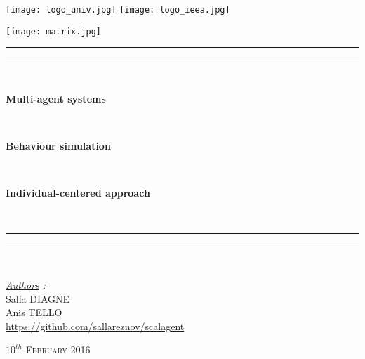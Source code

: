 \thispagestyle{cover}

\texttt{[image: logo\_univ.jpg]}
 \hfill \texttt{[image: logo\_ieea.jpg]} \\

\vspace*{3mm}

\begin{center}
	
	\texttt{[image: matrix.jpg]}
	
	\vspace*{8mm}

	\rule[0.5ex]{\linewidth}{2pt}\vspace*{-\baselineskip}\vspace*{3.2pt}
	\rule[0.5ex]{\linewidth}{1pt}\\[\baselineskip]

		\begin{Huge} \textbf{Multi-agent systems} \end{Huge}\\[4mm]
		\begin{Huge} \textbf{Behaviour simulation} \end{Huge}\\[4mm]
		\begin{Huge} \textbf{Individual-centered approach} \end{Huge}\\[4mm]
	\rule[0.5ex]{\linewidth}{1pt}\vspace*{-\baselineskip}\vspace{3.2pt}
	\rule[0.5ex]{\linewidth}{2pt}\\

	\vspace*{8mm}

	{\LARGE \textit{\underline{Authors} :}}\\
	\vspace*{3mm}
	{\LARGE Salla DIAGNE}\\
	\vspace*{3mm}
	{\LARGE Anis TELLO}\\
	
	\vspace*{6mm}
	\url{https://github.com/sallareznov/scalagent}
	
	\vspace*{12mm}
	
	{\LARGE\textsc{$10^{th}$ February 2016}}
\end{center}